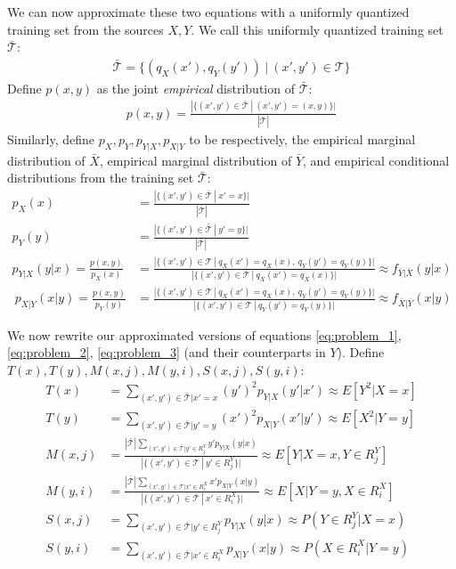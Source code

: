 We can now approximate these two equations with a uniformly quantized training set from the sources $X, Y$. We call this uniformly quantized training set $\mathcal{\bar T}$:
\begin{align}
    \mathcal{\bar T}=\{(q_X(x'),q_Y(y'))\ |\ (x',y')\in \mathcal T\}
\end{align}
Define $p(x,y)$ as the joint \emph{empirical} distribution of $\mathcal{\bar T}$:
\begin{align}
    p(x,y) = \frac{
        |\{(x',y')\in \mathcal{\bar T}\ |\ (x',y')=(x,y)\}|
        }{
        |\mathcal{\bar T}|
        }
\end{align}
Similarly, define $p_X, p_Y, p_{Y|X},p_{X|Y}$ to be respectively, the empirical marginal distribution of $\bar X$, empirical marginal distribution of $\bar Y$, and empirical conditional distributions from the training set $\mathcal{\bar T}$:
\begin{align}
    p_X(x) &= \frac{
        |\{(x',y')\in\mathcal{\bar T}\ |\ x'=x\}|
    }{
        |\mathcal{\bar T}|
    }\\
    p_Y(y) &= \frac{
        |\{(x',y')\in\mathcal{\bar T}\ |\ y'=y\}|
    }{
        |\mathcal{\bar T}|
    }\\
    \label{eq:cond_pmf_y}
    p_{Y|X}(y|x) = \frac{p(x,y)}{p_X(x)}
    &= \frac{
            |\{(x',y')\in \mathcal T\ |\ q_X(x')=q_X(x),\ q_Y(y')=q_Y(y)\}|
        }{
            |\{(x',y')\in \mathcal T\ |\ q_X(x')=q_X(x)\}|
        }\approx f_{\bar Y|\bar X}(y|x)\\\
    p_{X|Y}(x|y) = \frac{p(x,y)}{p_Y(y)}
    &=  \frac{
            |\{(x',y')\in \mathcal T\ |\ q_X(x')=q_X(x),\ q_Y(y')=q_Y(y)\}|
        }{
            |\{(x',y')\in \mathcal T\ |\ q_Y(y')=q_Y(y)\}|
        }\approx f_{\bar X|\bar Y}(x|y)
\end{align}

We now rewrite our approximated versions of equations \eqref{eq:problem_1}, \eqref{eq:problem_2}, \eqref{eq:problem_3} (and their counterparts in $Y$). Define $T(x),T(y),M(x,j),M(y,i),S(x,j),S(y,i)$:
\begin{align*}
    T(x) &= \sum_{(x',y')\in \mathcal{\bar T}|x'=x}(y')^2p_{Y|X}(y'|x') \approx E[Y^2 | X = x]\\
    T(y) &= \sum_{(x',y')\in \mathcal{\bar T}|y'=y}(x')^2p_{X|Y}(x'|y') \approx E[X^2 | Y = y]\\
    M(x,j) &= \frac{|\mathcal{\bar T}|\sum_{(x',y')\in \mathcal{\bar T}|y'\in R_j^Y}y'p_{Y|X}(y|x)}{|\{(x',y')\in \mathcal{\bar T}\ |\ y'\in R_j^Y\}|} \approx E[Y|X=x,Y\in R_j^Y]\\
    M(y,i) &= \frac{|\mathcal{\bar T}|\sum_{(x',y')\in \mathcal{\bar T}|x'\in R_i^X}x'p_{X|Y}(x|y)}{|\{(x',y')\in \mathcal{\bar T}\ |\ x'\in R_i^X\}|} \approx E[X|Y=y,X\in R_i^X]\\
    S(x,j) &= \sum_{(x',y')\in \mathcal{\bar T}|y'\in R_j^Y}p_{Y|X}(y|x) \approx P(Y\in R_j^Y|X=x)\\
    S(y,i) &= \sum_{(x',y')\in \mathcal{\bar T}|x'\in R_i^X}p_{X|Y}(x|y) \approx P(X\in R_i^X|Y=y)
\end{align*}

